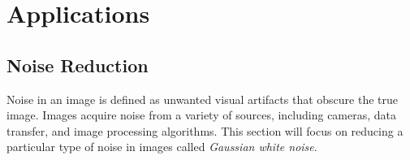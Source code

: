 \begin{comment} %
If this is included in the future, consider setting the coefficients of the final detail level to 0 instead of removing them from the reconstruction.
This gives similar results without reducing the size of the image.
\section*{Image Processing}
We are now ready to use the two-dimensional wavelet transform for image processing.
Wavelets are especially good at filtering out high-frequency noise from an image.
Just as we were able to pinpoint the noise added to the sine wave in Figure \ref{fig:dwt1D}, the majority of the noise added to an image will be contained in the final $LH$, $HL$, and $HH$ detail subbands of our wavelet decomposition.
If we decompose our image and reconstruct it with all subbands except these final subbands, we will eliminate most of the troublesome noise while preserving the primary aspects of the image.

We perform this cleaning as follows:
\begin{lstlisting}
image = imread(filename, cmap=True)
wavelet = pywt.Wavelet('haar')
WaveletCoeffs = pywt.wavedec2(image,wavelet)
new_image = pywt.waverec2(WaveletCoeffs[:-1], wavelet)
\end{lstlisting}

\begin{problem}
Write a function called \li{clean_image()} which accepts the name of a grayscale image file and cleans high-frequency noise out of the image.
Load the image as an ndarray, and perform a wavelet decomposition using PyWavelets.
Reconstruct the image using all subbands except the last set of detail coefficients, and return this cleaned image as an ndarray.
\end{problem}
\end{comment}


\section*{Applications}

\subsection*{Noise Reduction}
Noise in an image is defined as unwanted visual artifacts that obscure the true image.
Images acquire noise from a variety of sources, including cameras, data transfer, and image processing algorithms.
This section will focus on reducing a particular type of noise in images called \emph{Gaussian white noise}.

